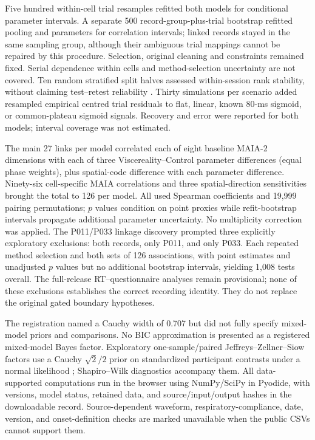 Five hundred within-cell trial resamples refitted both models for conditional parameter intervals. A separate 500 record-group-plus-trial bootstrap refitted pooling and parameters for correlation intervals; linked records stayed in the same sampling group, although their ambiguous trial mappings cannot be repaired by this procedure. Selection, original cleaning and constraints remained fixed. Serial dependence within cells and method-selection uncertainty are not covered. Ten random stratified split halves assessed within-session rank stability, without claiming test--retest reliability \citep{Hedge2018}. Thirty simulations per scenario added resampled empirical centred trial residuals to flat, linear, known 80-ms sigmoid, or common-plateau sigmoid signals. Recovery and error were reported for both models; interval coverage was not estimated.

The main 27 links per model correlated each of eight baseline MAIA-2 dimensions with each of three Viscereality--Control parameter differences (equal phase weights), plus spatial-code difference with each parameter difference. Ninety-six cell-specific MAIA correlations and three spatial-direction sensitivities brought the total to 126 per model. All used Spearman coefficients and 19{,}999 pairing permutations; $p$ values condition on point proxies while refit-bootstrap intervals propagate additional parameter uncertainty. No multiplicity correction was applied. The P011/P033 linkage discovery prompted three explicitly exploratory exclusions: both records, only P011, and only P033. Each repeated method selection and both sets of 126 associations, with point estimates and unadjusted $p$ values but no additional bootstrap intervals, yielding 1,008 tests overall. The full-release RT--questionnaire analyses remain provisional; none of these exclusions establishes the correct recording identity. They do not replace the original gated boundary hypotheses.

The registration named a Cauchy width of 0.707 but did not fully specify mixed-model priors and comparisons. No BIC approximation is presented as a registered mixed-model Bayes factor. Exploratory one-sample/paired Jeffreys--Zellner--Siow factors use a Cauchy $\sqrt{2}/2$ prior on standardized participant contrasts under a normal likelihood \citep{Rouder2009BayesianT}; Shapiro--Wilk diagnostics accompany them. All data-supported computations run in the browser using NumPy/SciPy in Pyodide, with versions, model status, retained data, and source/input/output hashes in the downloadable record. Source-dependent waveform, respiratory-compliance, date, version, and onset-definition checks are marked unavailable when the public CSVs cannot support them.

